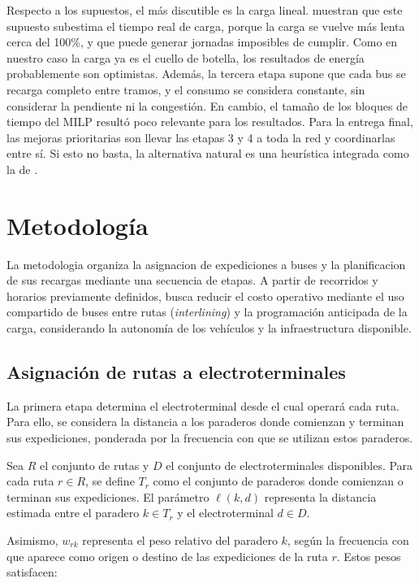 Respecto a los supuestos, el más discutible es la carga lineal.  muestran que este supuesto subestima el tiempo real de carga, porque la carga se vuelve más lenta cerca del 100\%, y que puede generar jornadas imposibles de cumplir. Como en nuestro caso la carga ya es el cuello de botella, los resultados de energía probablemente son optimistas. Además, la tercera etapa supone que cada bus se recarga completo entre tramos, y el consumo se considera constante, sin considerar la pendiente ni la congestión. En cambio, el tamaño de los bloques de tiempo del MILP resultó poco relevante para los resultados. Para la entrega final, las mejoras prioritarias son llevar las etapas 3 y 4 a toda la red y coordinarlas entre sí. Si esto no basta, la alternativa natural es una heurística integrada como la de .

\section{Metodología}

La metodologia organiza la asignacion de expediciones a buses y la planificacion de sus recargas mediante una secuencia de etapas. A partir de recorridos y horarios previamente definidos, busca reducir el costo operativo mediante el uso compartido de buses entre rutas
(\textit{interlining}) y la programación anticipada de la carga, considerando la autonomía de los vehículos y la infraestructura disponible. 




\subsection{Asignación de rutas a electroterminales}

La primera etapa determina el electroterminal desde el cual operará cada
ruta. Para ello, se considera la distancia a los paraderos donde comienzan
y terminan sus expediciones, ponderada por la frecuencia con que se utilizan estos paraderos.

Sea $R$ el conjunto de rutas y $D$ el conjunto de electroterminales
disponibles. Para cada ruta $r \in R$, se define $T_r$ como el conjunto
de paraderos donde comienzan o terminan sus expediciones. El parámetro
$\ell(k,d)$ representa la distancia estimada entre el paradero
$k \in T_r$ y el electroterminal $d \in D$.

Asimismo, $w_{rk}$ representa el peso relativo del paradero $k$, según
la frecuencia con que aparece como origen o destino de las expediciones
de la ruta $r$. Estos pesos satisfacen:

